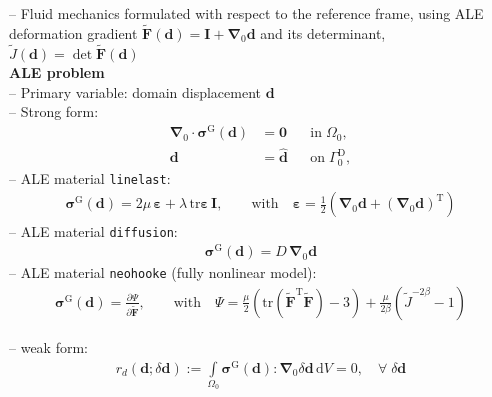 \documentclass[a4paper,12pt]{report}
\newcommand{\bs}[1]{\boldsymbol{#1}}
\newcommand{\Om}{\mathit{\Omega}}
\newcommand{\Gm}{\mathit{\Gamma}}
\begin{document}
-- Fluid mechanics formulated with respect to the reference frame, using ALE deformation gradient $\widetilde{\bs{F}}(\bs{d}) = \bs{I} + \bs{\nabla}_0\bs{d}$ and its determinant, $\widetilde{J}(\bs{d})=\det \widetilde{\bs{F}}(\bs{d})$\\

\textbf{ALE problem}\\

-- Primary variable: domain displacement $\bs{d}$\\

-- Strong form:
\begin{equation}
\label{equation-ale-strong-form}
\begin{aligned}
\bs{\nabla}_{0} \cdot \bs{\sigma}^{\mathrm{G}}(\bs{d}) &= \bs{0} &&\text{in} \; \mathit{\Om}_0, \\
\bs{d} &= \hat{\bs{d}} &&\text{on} \; \mathit{\Gm}_0^{\mathrm{D}},
\end{aligned}
\end{equation}
-- ALE material \verb.linelast.:
\begin{equation}
\begin{aligned}
\bs{\sigma}^{\mathrm{G}}(\bs{d}) = 2\mu \,\bs{\varepsilon} + \lambda \,\mathrm{tr}\bs{\varepsilon}\,\bs{I}, \qquad \text{with}\quad \bs{\varepsilon} = \frac{1}{2}\left(\bs{\nabla}_0\bs{d} + (\bs{\nabla}_0\bs{d})^{\mathrm{T}}\right)
\end{aligned}
\end{equation}
-- ALE material \verb.diffusion.:
\begin{equation}
\begin{aligned}
\bs{\sigma}^{\mathrm{G}}(\bs{d}) = D \,\bs{\nabla}_0\bs{d}
\end{aligned}
\end{equation}
-- ALE material \verb.neohooke. (fully nonlinear model):
\begin{equation}
\begin{aligned}
\bs{\sigma}^{\mathrm{G}}(\bs{d}) = \frac{\partial \mathit{\Psi}}{\partial \widetilde{\bs{F}}}, \qquad \text{with}\quad \mathit{\Psi} = \frac{\mu}{2}\left(\mathrm{tr}(\widetilde{\bs{F}}^{\mathrm{T}}\widetilde{\bs{F}}) - 3\right) + \frac{\mu}{2\beta} \left(\widetilde{J}^{-2\beta} - 1\right)
\end{aligned}
\end{equation}

-- weak form:
\begin{equation}
\label{equation-ale-weak-form}
\begin{aligned}
r_{d}(\bs{d};\delta\bs{d}) := \int\limits_{\Om_0}\bs{\sigma}^{\mathrm{G}}(\bs{d}) : \bs{\nabla}_{0}\delta\bs{d}\,\mathrm{d}V = 0, \quad \forall \; \delta\bs{d}
\end{aligned}
\end{equation}
\end{document}
